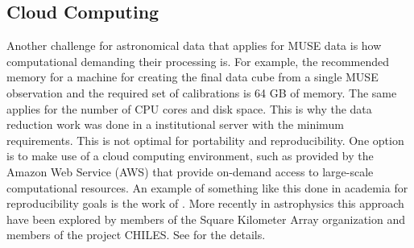 \subsection{Cloud Computing}

Another challenge for astronomical data that applies for MUSE data is how computational demanding their processing is. For example, the recommended memory for a machine for creating the final data cube from a single MUSE observation and the required set of calibrations is 64 GB of memory. The same applies for the number of CPU cores and disk space. This is why the data reduction work was done in a institutional server with the minimum requirements. This is not optimal for portability and reproducibility. One option is to make use of a cloud computing environment, such as provided by the Amazon Web Service (AWS) that provide on-demand access to large-scale computational resources. An example of something like this done in academia for reproducibility goals is the work of \cite{ragan-kelley_collaborative_2013}. More recently in astrophysics this approach have been explored by members of the Square Kilometer Array organization and members of the project CHILES. See \cite{Dodson_SKAAmazon_2016} for the details. 

